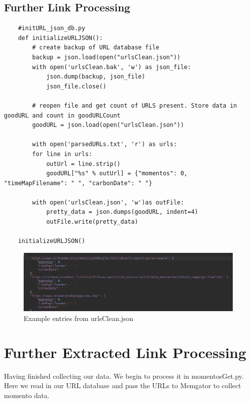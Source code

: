 \documentclass[11pt]{article}
\begin{document}
	\subsection{Further Link Processing}
	\begin{lstlisting}
	#initURL_json_db.py
	def initializeURLJSON():
	    # create backup of URL database file
	    backup = json.load(open("urlsClean.json"))
	    with open('urlsClean.bak', 'w') as json_file:
	        json.dump(backup, json_file)
	        json_file.close()
	
	    # reopen file and get count of URLS present. Store data in goodURL and count in goodURLCount
	    goodURL = json.load(open("urlsClean.json"))
	
	    with open('parsedURLs.txt', 'r') as urls:
	    for line in urls:
	        outUrl = line.strip()
	        goodURL["%s" % outUrl] = {"momentos": 0, "timeMapFilename": " ", "carbonDate": " "}
	
	    with open('urlsClean.json', 'w')as outFile:
	        pretty_data = json.dumps(goodURL, indent=4)
	        outFile.write(pretty_data)
	
	initializeURLJSON()
	\end{lstlisting}
	\begin{figure}[h!]
		\includegraphics[scale=0.5]{resources/urlCleanFile.png}
		\caption{Example entries from urlsClean.json}
	\end{figure}
	\section{Further Extracted Link Processing }
		\hspace{10mm} Having finished collecting our data. We begin to process it in momentosGet.py. Here we read in our URL database and pass the URLs to Memgator to collect momento data. 
\end{document}
